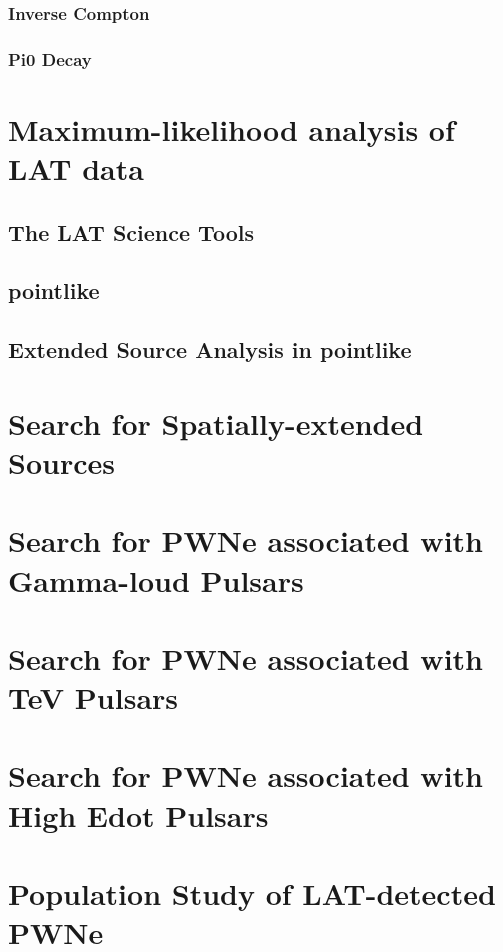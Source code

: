 \documentclass[12pt]{report}
\begin{document}
\subsection{Inverse Compton}
\subsection{Pi0 Decay}


\chapter{Maximum-likelihood analysis of LAT data}
\section{The LAT Science Tools}
\section{pointlike}
\section{Extended Source Analysis in pointlike}

\chapter{Search for Spatially-extended Sources}

\chapter{Search for PWNe associated with Gamma-loud Pulsars}

\chapter{Search for PWNe associated with TeV Pulsars}

\chapter{Search for PWNe associated with High Edot Pulsars}

\chapter{Population Study of LAT-detected PWNe}


\appendix

%
%
%





\end{document}
